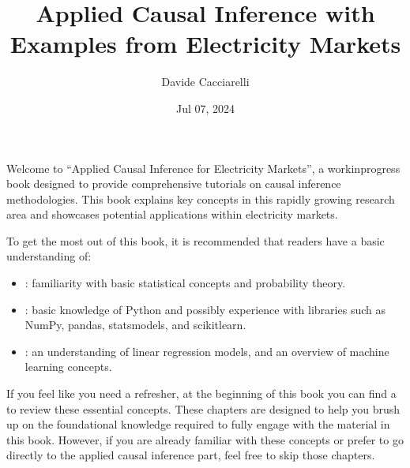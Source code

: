 \documentclass[letterpaper,10pt,english]{jupyterBook}
\title{Applied Causal Inference with Examples from Electricity Markets}
\date{Jul 07, 2024}
\author{Davide Cacciarelli}
\begin{document}
\pagestyle{empty}
\sphinxmaketitle
\pagestyle{plain}
\sphinxtableofcontents
\pagestyle{normal}
\label{\detokenize{intro::doc}}


\sphinxAtStartPar
Welcome to “Applied Causal Inference for Electricity Markets”, a work\sphinxhyphen{}in\sphinxhyphen{}progress book designed to provide comprehensive tutorials on causal inference methodologies. This book explains key concepts in this rapidly growing research area and showcases potential applications within electricity markets.

\sphinxAtStartPar
{}

\sphinxAtStartPar
To get the most out of this book, it is recommended that readers have a basic understanding of:
\begin{itemize}
\item {} 
\sphinxAtStartPar
{}: familiarity with basic statistical concepts and probability theory.

\item {} 
\sphinxAtStartPar
{}: basic knowledge of Python and possibly experience with libraries such as NumPy, pandas, statsmodels, and scikit\sphinxhyphen{}learn.

\item {} 
\sphinxAtStartPar
{}: an understanding of linear regression models, and an overview of machine learning concepts.

\end{itemize}

\sphinxAtStartPar
If you feel like you need a refresher, at the beginning of this book you can find a  to review these essential concepts. These chapters are designed to help you brush up on the foundational knowledge required to fully engage with the material in this book. However, if you are already familiar with these concepts or prefer to go directly to the applied causal inference part, feel free to skip those chapters.

\sphinxAtStartPar
{}
\end{document}
